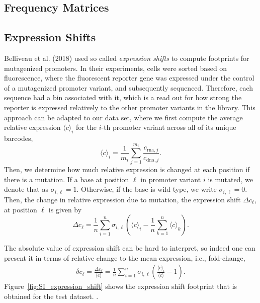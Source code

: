 \subsection{Frequency Matrices}


\subsection{Expression Shifts}
Belliveau et al. (2018)\cite{belliveau2018systematic} used so called \textit{expression shifts} to compute footprints for mutagenized promoters. In their experiments, cells were sorted based on fluorescence, where the fluorescent reporter gene was expressed under the control of a mutagenized promoter variant, and subsequently sequenced. Therefore, each sequence had a bin associated with it, which is a read out for how strong the reporter is expressed relatively to the other promoter variants in the library. This approach can be adapted to our data set, where we first compute the average relative expression $\langle c \rangle_i$ for the $i$-th promoter variant across all of its unique barcodes,
\begin{equation}
    \langle c \rangle_i = \frac{1}{m_i}\sum_{j=1}^{m_i} \frac{c_{\mathrm{rna}, j}}{c_{\mathrm{dna}, j}}.
\end{equation}
Then, we determine how much relative expression is changed at each position if there is a mutation. If a base at position $\ell$ in promoter variant $i$ is mutated, we denote that as $\sigma_{i, \ell}=1$. Otherwise, if the base is wild type, we write $\sigma_{i, \ell}=0$. Then, the change in relative expression due to mutation, the expression shift $\Delta c_\ell$, at position $\ell$ is given by
\begin{equation}
   \Delta c_\ell =\frac{1}{n}\sum_{i=1}^n \sigma_{i, \ell} \left( \langle c \rangle_i - \frac{1}{n}\sum_{k=1}^n \langle c \rangle_k \right).
\end{equation}

The absolute value of expression shift can be hard to interpret, so indeed one can present it in terms of relative change to the mean expression, i.e., fold-change,
\begin{eqnarray}
    \delta c_\ell = \frac{\Delta c_\ell}{\langle c \rangle} =\frac{1}{n}\sum_{i=1}^n \sigma_{i, \ell} \left( \frac{\langle c \rangle_i}{\langle c \rangle} - 1 \right).
\end{eqnarray}
Figure~\ref{fig:SI_expression_shift} shows the expression shift footprint that is obtained for the test dataset. .
